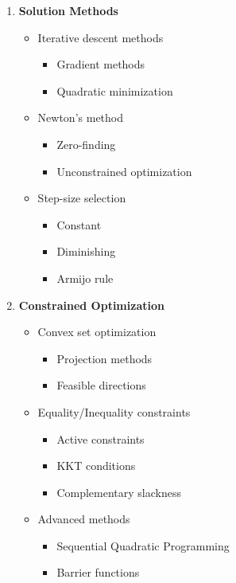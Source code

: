 \documentclass[openany]{book}
\theoremstyle{definition}
\theoremstyle{remark}
\begin{document}
\begin{enumerate}
    \item \textbf{Solution Methods}
        \begin{itemize}
            \item Iterative descent methods
                \begin{itemize}
                    \item Gradient methods
                    \item Quadratic minimization
                \end{itemize}
            \item Newton's method
                \begin{itemize}
                    \item Zero-finding
                    \item Unconstrained optimization
                \end{itemize}
            \item Step-size selection
                \begin{itemize}
                    \item Constant
                    \item Diminishing
                    \item Armijo rule
                \end{itemize}
        \end{itemize}
    
    \item \textbf{Constrained Optimization}
        \begin{itemize}
            \item Convex set optimization
                \begin{itemize}
                    \item Projection methods
                    \item Feasible directions
                \end{itemize}
            \item Equality/Inequality constraints
                \begin{itemize}
                    \item Active constraints
                    \item KKT conditions
                    \item Complementary slackness
                \end{itemize}
            \item Advanced methods
                \begin{itemize}
                    \item Sequential Quadratic Programming
                    \item Barrier functions
                \end{itemize}
        \end{itemize}
    

\end{enumerate}
\end{document}
